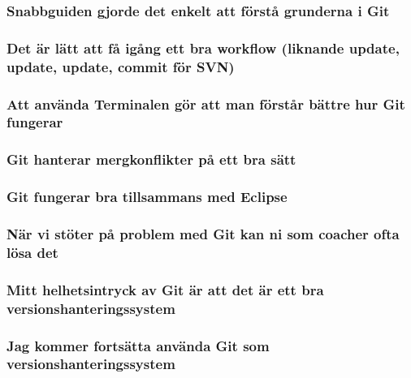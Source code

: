 \subsubsection{Snabbguiden gjorde det enkelt att förstå grunderna i Git}

\subsubsection{Det är lätt att få igång ett bra workflow (liknande update, update, update, commit för SVN)}


\subsubsection{Att använda Terminalen gör att man förstår bättre hur Git fungerar}


\subsubsection{Git hanterar mergkonflikter på ett bra sätt}


\subsubsection{Git fungerar bra tillsammans med Eclipse}


\subsubsection{När vi stöter på problem med Git kan ni som coacher ofta lösa det}


\subsubsection{Mitt helhetsintryck av Git är att det är ett bra versionshanteringssystem}


\subsubsection{Jag kommer fortsätta använda Git som versionshanteringssystem}
